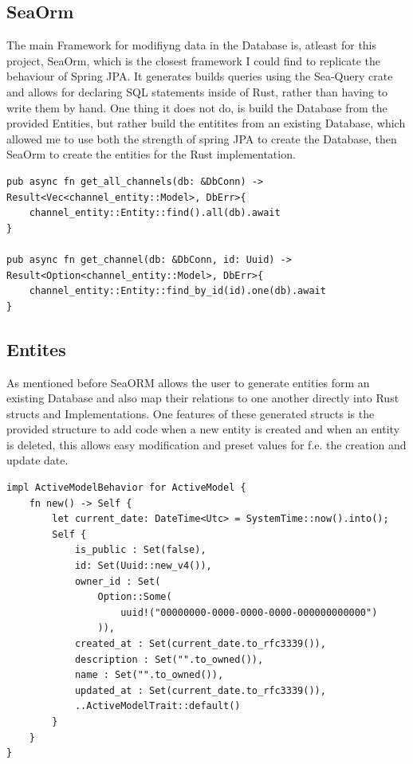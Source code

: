 \documentclass[a4paper,12pt]{article}
\begin{document}
	\subsection{SeaOrm}
	\label{subsec:sea_orm}
	The main Framework for modifiyng data in the Database is, atleast for this project, SeaOrm, which
	is the closest framework I could find to replicate the behaviour of Spring JPA. It generates 
	builds queries using the Sea-Query crate and allows for declaring SQL statements inside of Rust,
	rather than having to write them by hand. One thing it does not do, is build the Database from the
	provided Entities, but rather build the entitites from an existing Database, which allowed me to
	use both the strength of spring JPA to create the Database, then SeaOrm to create the entities
	for the Rust implementation.
	\begin{lstlisting}
pub async fn get_all_channels(db: &DbConn) -> Result<Vec<channel_entity::Model>, DbErr>{
    channel_entity::Entity::find().all(db).await
}

pub async fn get_channel(db: &DbConn, id: Uuid) -> Result<Option<channel_entity::Model>, DbErr>{
    channel_entity::Entity::find_by_id(id).one(db).await
}
	\end{lstlisting}
	
	\subsection*{Entites}
	As mentioned before SeaORM allows the user to generate entities form an existing Database and
	also map their relations to one another directly into Rust structs and Implementations. One
	features of these generated structs is the provided structure to add code when a new entity is
	created and when an entity is deleted, this allows easy modification and preset values for f.e.
	the creation and update date.

	\begin{lstlisting}
impl ActiveModelBehavior for ActiveModel {
    fn new() -> Self {
        let current_date: DateTime<Utc> = SystemTime::now().into();
        Self {
            is_public : Set(false),
            id: Set(Uuid::new_v4()),
            owner_id : Set(
				Option::Some(
					uuid!("00000000-0000-0000-0000-000000000000")
				)),
            created_at : Set(current_date.to_rfc3339()),
            description : Set("".to_owned()),
            name : Set("".to_owned()),
            updated_at : Set(current_date.to_rfc3339()),
            ..ActiveModelTrait::default()
        }
    }
}
	\end{lstlisting}
\end{document}
